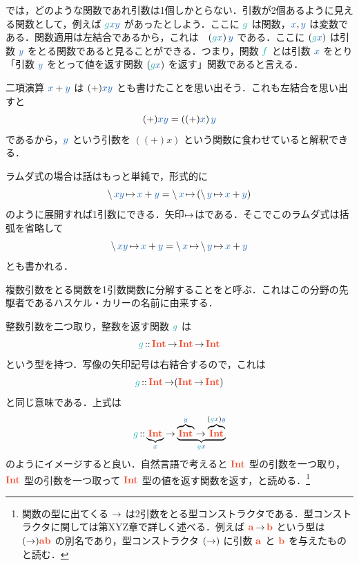 \documentclass[a5paper,twoside,fleqn,draft]{jsbook}
\begin{document}
\haskell では，どのような関数であれ引数は1個しかとらない．引数が2個あるように見える関数として，例えば $\hFunc{g}\hVar{x}\hVar{y}$ があったとしよう．ここに $\hFunc{g}$ は関数，$\hVar{x},\hVar{y}$ は変数である．関数適用は左結合であるから，これは　$\left(\hFunc{g}\hVar{x}\right)\hVar{y}$ である．ここに $\left(\hFunc{g}\hVar{x}\right)$ は引数 $\hVar{y}$ をとる関数であると見ることができる．つまり，関数 $\hFunc{f}$ とは引数 $\hVar{x}$ をとり「引数 $\hVar{y}$ をとって値を返す関数 $\left(\hFunc{g}\hVar{x}\right)$ を返す」関数であると言える．

二項演算 $\hVar{x}+\hVar{y}$ は $(+)\hVar{x}\hVar{y}$ とも書けたことを思い出そう．これも左結合を思い出すと
\begin{equation}
  (+)\hVar{x}\hVar{y}
  =\left((+)\hVar{x}\right)\hVar{y}
\end{equation}
であるから，$\hVar{y}$ という引数を $\left((+)x\right)$ という関数に食わせていると解釈できる．

ラムダ式の場合は話はもっと単純で，形式的に
\begin{equation}
  \mLambda\hVar{x}\hVar{y}\mLambdaArrow\hVar{x}+\hVar{y}
  =\mLambda\hVar{x}\mLambdaArrow\left(\mLambda\hVar{y}\mLambdaArrow\hVar{x}+\hVar{y}\right)
\end{equation}
のように展開すれば1引数にできる．矢印$\operatorname{\mapsto}$はである．そこでこのラムダ式は括弧を省略して
\begin{equation}
  \mLambda\hVar{x}\hVar{y}\mLambdaArrow\hVar{x}+\hVar{y}
  =\mLambda\hVar{x}\mLambdaArrow\mLambda\hVar{y}\mLambdaArrow\hVar{x}+\hVar{y}
\end{equation}
とも書かれる．

複数引数をとる関数を1引数関数に分解することをと呼ぶ．これはこの分野の先駆者であるハスケル・カリーの名前に由来する．


整数引数を二つ取り，整数を返す関数 $\hFunc{g}$ は
\begin{equation}
  \hFunc{g}
  \mIn\mIntType\mFuncArrow\mIntType\mFuncArrow\mIntType
\end{equation}
という型を持つ．写像の矢印記号は右結合するので，これは
\begin{equation}
  \hFunc{g}
  \mIn\mIntType\mFuncArrow(\mIntType\mFuncArrow\mIntType)
\end{equation}
と同じ意味である．上式は
\begin{equation*}
  \hFunc{g}
  \mIn\underbrace{\mIntType}_{\hVar{x}}
  \mFuncArrow\underbrace{\overbrace{\mIntType}^{\hVar{y}}\mFuncArrow\overbrace{\mIntType}^{(\hFunc{g}\hVar{x})\hVar{y}}}_{\hFunc{g}\hVar{x}}
\end{equation*}
のようにイメージすると良い．自然言語で考えると $\mIntType$ 型の引数を一つ取り，$\mIntType$ 型の引数を一つ取って $\mIntType$ 型の値を返す関数を返す，と読める．\footnote{関数の型に出てくる $\operatorname{\rightarrow}$ は2引数をとる型コンストラクタである．型コンストラクタに関しては第XYZ章で詳しく述べる．例えば $\mA\mFuncArrow\mB$ という型は $(\mFuncArrow)\mA\mB$ の別名であり，型コンストラクタ $(\operatorname{\rightarrow})$ に引数 $\mA$ と $\mB$ を与えたものと読む．}
\end{document}
